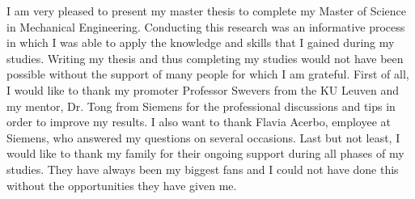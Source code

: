 \documentclass[master=wtk,english]{kulemt}
\begin{document}

\begin{preface}
	I am very pleased to present my master thesis to complete my Master of Science in Mechanical Engineering. Conducting this research was an informative process in which I was able to apply the knowledge and skills that I gained during my studies. Writing my thesis and thus completing my studies would not have been possible without the support of many people for which I am grateful. First of all, I would like to thank my promoter Professor Swevers from the KU Leuven and my mentor, Dr. Tong from Siemens for the professional discussions and tips in order to improve my results. I also want to thank Flavia Acerbo, employee at Siemens, who answered my questions on several occasions. Last but not least, I would like to thank my family for their ongoing support during all phases of my studies. They have always been my biggest fans and I could not have done this without the opportunities they have given me. 
	
\end{preface}

\tableofcontents*
\end{document}
